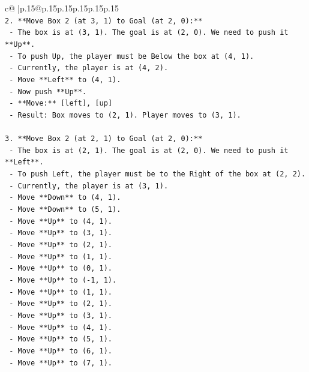 \documentclass{article}
\begin{document}
{\begin{supertabular}{c@{$\;$}|p{.15\linewidth}@{}p{.15\linewidth}p{.15\linewidth}p{.15\linewidth}p{.15\linewidth}p{.15\linewidth}}
{{{\\ 
\texttt{2.  **Move Box 2 (at 3, 1) to Goal (at 2, 0):**} \\
\texttt{    {-} The box is at (3, 1). The goal is at (2, 0). We need to push it **Up**.} \\
\texttt{    {-} To push Up, the player must be Below the box at (4, 1).} \\
\texttt{    {-} Currently, the player is at (4, 2).} \\
\texttt{    {-} Move **Left** to (4, 1).} \\
\texttt{    {-} Now push **Up**.} \\
\texttt{    {-} **Move:** {[}left{]}, {[}up{]}} \\
\texttt{    {-} Result: Box moves to (2, 1). Player moves to (3, 1).} \\
\\ 
\texttt{3.  **Move Box 2 (at 2, 1) to Goal (at 2, 0):**} \\
\texttt{    {-} The box is at (2, 1). The goal is at (2, 0). We need to push it **Left**.} \\
\texttt{    {-} To push Left, the player must be to the Right of the box at (2, 2).} \\
\texttt{    {-} Currently, the player is at (3, 1).} \\
\texttt{    {-} Move **Down** to (4, 1).} \\
\texttt{    {-} Move **Down** to (5, 1).} \\
\texttt{    {-} Move **Up** to (4, 1).} \\
\texttt{    {-} Move **Up** to (3, 1).} \\
\texttt{    {-} Move **Up** to (2, 1).} \\
\texttt{    {-} Move **Up** to (1, 1).} \\
\texttt{    {-} Move **Up** to (0, 1).} \\
\texttt{    {-} Move **Up** to ({-}1, 1).} \\
\texttt{    {-} Move **Up** to (1, 1).} \\
\texttt{    {-} Move **Up** to (2, 1).} \\
\texttt{    {-} Move **Up** to (3, 1).} \\
\texttt{    {-} Move **Up** to (4, 1).} \\
\texttt{    {-} Move **Up** to (5, 1).} \\
\texttt{    {-} Move **Up** to (6, 1).} \\
\texttt{    {-} Move **Up** to (7, 1).} \\
}}}
\end{supertabular}}
\end{document}
